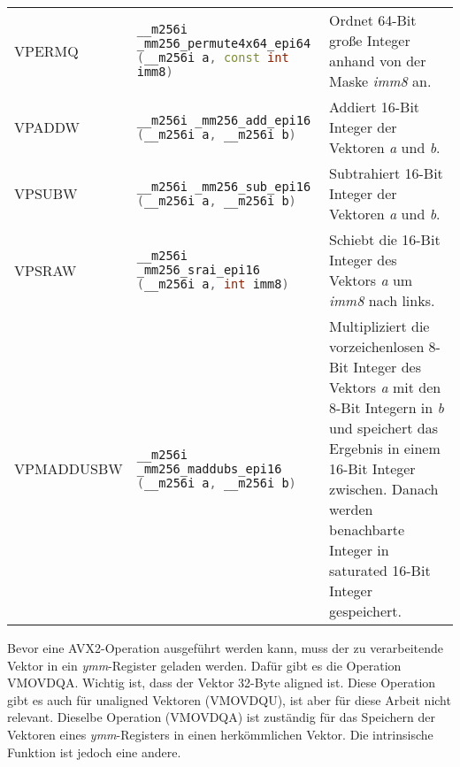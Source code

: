 \begin{table}[ht]
\begin{footnotesize}
\begin{tabularx}{\textwidth}{l X X}
      VPERMQ          & \lstinline[language=C++]{__m256i _mm256_permute4x64_epi64 (__m256i a, const int imm8)}    & Ordnet 64-Bit große Integer anhand von der Maske \emph{imm8} an.                                                                                                                                                                                              \\
      VPADDW          & \lstinline[language=C++]{__m256i _mm256_add_epi16 (__m256i a, __m256i b)}    & Addiert 16-Bit Integer der Vektoren \emph{a} und \emph{b}.                                                                                                                                                                                       \\
      VPSUBW          & \lstinline[language=C++]{__m256i _mm256_sub_epi16 (__m256i a, __m256i b)}    & Subtrahiert 16-Bit Integer der Vektoren \emph{a} und \emph{b}.                                                                                                                                                                                      \\
      VPSRAW          & \lstinline[language=C++]{__m256i _mm256_srai_epi16 (__m256i a, int imm8)}    & Schiebt die 16-Bit Integer des Vektors \emph{a} um \emph{imm8} nach links.                                                                                                                                                                         \\
      VPMADDUSBW      & \lstinline[language=C++]{__m256i _mm256_maddubs_epi16 (__m256i a, __m256i b)}    & Multipliziert die vorzeichenlosen 8-Bit Integer des Vektors \emph{a} mit den 8-Bit Integern in \emph{b} und speichert das Ergebnis in einem 16-Bit Integer zwischen. Danach werden benachbarte Integer in saturated 16-Bit Integer gespeichert.                         \\
      \bottomrule
    \end{tabularx}
  \end{footnotesize}
  \rmfamily
\end{table}

Bevor eine \ac{AVX2}-Operation ausgeführt werden kann, muss der zu verarbeitende Vektor in ein \emph{ymm}-Register geladen werden. Dafür gibt es die Operation VMOVDQA. Wichtig ist, dass der Vektor 32-Byte aligned ist. Diese Operation gibt es auch für unaligned Vektoren (VMOVDQU), ist aber für diese Arbeit nicht relevant. Dieselbe Operation (VMOVDQA) ist zuständig für das Speichern der Vektoren eines \emph{ymm}-Registers in einen herkömmlichen Vektor. Die intrinsische Funktion ist jedoch eine andere.

